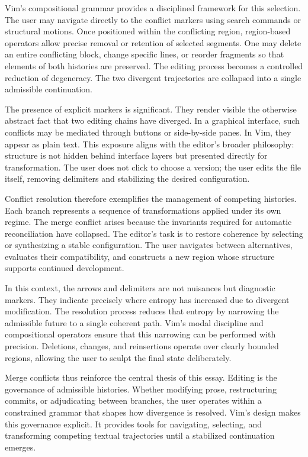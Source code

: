 \documentclass[12pt]{article}
\begin{document}
Vim’s compositional grammar provides a disciplined framework for this selection. The user may navigate directly to the conflict markers using search commands or structural motions. Once positioned within the conflicting region, region-based operators allow precise removal or retention of selected segments. One may delete an entire conflicting block, change specific lines, or reorder fragments so that elements of both histories are preserved. The editing process becomes a controlled reduction of degeneracy. The two divergent trajectories are collapsed into a single admissible continuation.

The presence of explicit markers is significant. They render visible the otherwise abstract fact that two editing chains have diverged. In a graphical interface, such conflicts may be mediated through buttons or side-by-side panes. In Vim, they appear as plain text. This exposure aligns with the editor’s broader philosophy: structure is not hidden behind interface layers but presented directly for transformation. The user does not click to choose a version; the user edits the file itself, removing delimiters and stabilizing the desired configuration.

Conflict resolution therefore exemplifies the management of competing histories. Each branch represents a sequence of transformations applied under its own regime. The merge conflict arises because the invariants required for automatic reconciliation have collapsed. The editor’s task is to restore coherence by selecting or synthesizing a stable configuration. The user navigates between alternatives, evaluates their compatibility, and constructs a new region whose structure supports continued development.

In this context, the arrows and delimiters are not nuisances but diagnostic markers. They indicate precisely where entropy has increased due to divergent modification. The resolution process reduces that entropy by narrowing the admissible future to a single coherent path. Vim’s modal discipline and compositional operators ensure that this narrowing can be performed with precision. Deletions, changes, and reinsertions operate over clearly bounded regions, allowing the user to sculpt the final state deliberately.

Merge conflicts thus reinforce the central thesis of this essay. Editing is the governance of admissible histories. Whether modifying prose, restructuring commits, or adjudicating between branches, the user operates within a constrained grammar that shapes how divergence is resolved. Vim’s design makes this governance explicit. It provides tools for navigating, selecting, and transforming competing textual trajectories until a stabilized continuation emerges.
\end{document}
